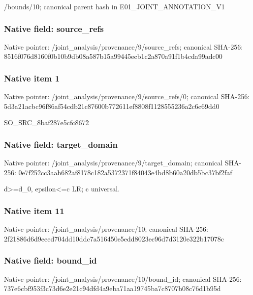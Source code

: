 \documentclass[10pt,a4paper]{article}
\begin{document}
\begingroup\raggedright\sloppy /\allowbreak{}bounds/\allowbreak{}10;\allowbreak{} canonical parent hash in E01\_\allowbreak{}JOINT\_\allowbreak{}ANNOTATION\_\allowbreak{}V1\par\endgroup

\subsubsection{Native field: source\_\allowbreak{}refs}
Native pointer: /joint\_\allowbreak{}analysis/provenance/9/source\_\allowbreak{}refs; canonical SHA-256: 8516f076d8160f0b10b9db08a587b15a99445ecb1c2a870a91f1b4cda99adc00

\subsubsection{Native item 1}
Native pointer: /joint\_\allowbreak{}analysis/provenance/9/source\_\allowbreak{}refs/0; canonical SHA-256: 5d3a21acbc96f86af54cdb21c87600b772611ef8808f1128555236a2c6c69dd0

\begingroup\raggedright\sloppy SO\_\allowbreak{}SRC\_\allowbreak{}8baf287e5cfc8672\par\endgroup

\subsubsection{Native field: target\_\allowbreak{}domain}
Native pointer: /joint\_\allowbreak{}analysis/provenance/9/target\_\allowbreak{}domain; canonical SHA-256: 0e7f252cc3aab682af8178c182a5372371f84043e4bd8b60a20db5bc37bf2faf

\begingroup\raggedright\sloppy d>=\allowbreak{}d\_\allowbreak{}0,\allowbreak{} epsilon<=\allowbreak{}c LR;\allowbreak{} c universal.\par\endgroup

\subsubsection{Native item 11}
Native pointer: /joint\_\allowbreak{}analysis/provenance/10; canonical SHA-256: 2f21886d6d9eeed704dd10ddc7a516450e5edd8023ec96d7d3120e322b17078c

\subsubsection{Native field: bound\_\allowbreak{}id}
Native pointer: /joint\_\allowbreak{}analysis/provenance/10/bound\_\allowbreak{}id; canonical SHA-256: 737e6cbf953f3c73d6e2e21c94dfd4a9eba71aa19745ba7c8707b08c76d1b95d
\end{document}
